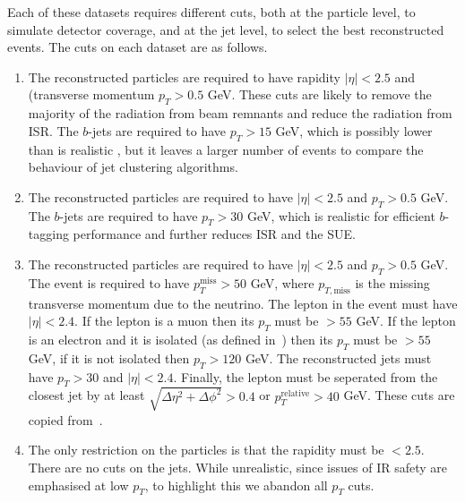     Each of these datasets requires different cuts, both at the particle level, to simulate detector coverage, and at the jet level, to select the best reconstructed events.
    The cuts on each dataset are as follows.
    \begin{enumerate}
        \item The reconstructed particles are required to have
            rapidity \(|\eta|< 2.5\) and (transverse momentum \(p_T > 0.5\) GeV.
            These cuts are likely to remove the majority of the radiation from beam remnants
            and reduce the radiation from ISR.
            The $b$-jets are required to have \(p_T > 15\) GeV, which is possibly lower than is realistic \cite{Chakraborty:2020vwj},
            but it leaves a larger number of events to compare the behaviour of jet clustering algorithms.

        \item  The reconstructed particles are required to have
             \(|\eta|< 2.5\) and \(p_T > 0.5\) GeV.
            The $b$-jets are required to have \(p_T > 30\) GeV, which is realistic for efficient $b$-tagging performance and further reduces ISR and the SUE.
            
        \item The reconstructed particles are required to have
             \(|\eta|< 2.5\) and \(p_T > 0.5\) GeV.
            The event is required to have  \(p_{T}^{\text{miss}} > 50\) GeV,
            where \(p_{T, \text{miss}}\) is the missing transverse momentum due to 
            the neutrino.
            The lepton in the event must have  \(|\eta|< 2.4\).
            If the lepton  is a muon then its \(p_T\) must be \(>  55\) GeV.
            If the lepton  is an electron and it is isolated (as defined in~\cite{Sirunyan_2018}) then its \(p_T\) must be \(> 55\) GeV, if it is not isolated then \(p_T > 120\) GeV.
            The reconstructed jets must have \(p_T > 30\) and \(|\eta|< 2.4\).
            Finally, the lepton must be seperated from the closest jet by at least
            \(\sqrt{\Delta\eta^2 + \Delta \phi^2} > 0.4\) or
            \(p_{T}^{\text{relative}} > 40\) GeV.
            These cuts are copied from~\cite{Sirunyan_2020}.
        \item The only restriction on the particles is that the rapidity must be \(< 2.5\).
            There are no cuts on the jets. While unrealistic, since 
            issues of IR safety are emphasised at low \(p_T\),  to highlight this we abandon all \(p_T\) cuts.

    \end{enumerate}


